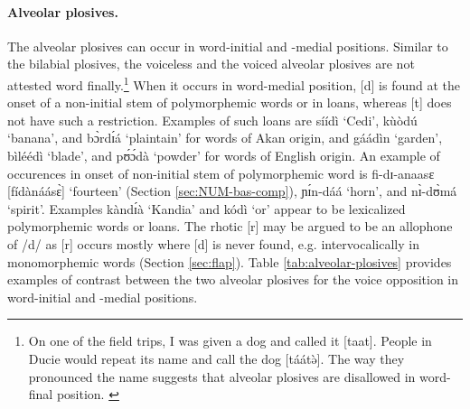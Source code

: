 \paragraph{Alveolar plosives.}
\label{sec:PHO-alveo-plos}  

The alveolar plosives can occur in word-initial and  -medial positions. Similar
to the bilabial plosives, the voiceless and the voiced alveolar plosives  are
not attested word finally.\footnote{On one of the field trips, I was given a dog
and  called it [{\sls taat}]. People in Ducie would repeat its name and call 
the 
dog
[{\sls táátə̀}]. The way they pronounced the name suggests that alveolar 
plosives are disallowed in word-final position. \label{fn:taat-epenthesis}}  
When it occurs in word-medial position,  [{\sls  d}] is found  at the onset of 
a 
non-initial stem of polymorphemic words or in loans, whereas [{\sls t}] does 
not 
have such a restriction. Examples of such loans are  {\sls síídì} `Cedi', 
{\sls kùòdú} `banana', and {\sls bɔ̀rdɪ́á} `plaintain'  for words of Akan 
origin, and  {\sls gáádìn} `garden', {\sls bìléédì} `blade',  and 
{\sls ﻿pʊ́ɔ́dà} `powder' for words of English origin. An example of occurences 
in onset of non-initial stem of polymorphemic word is {\sls fi-dɪ-anaasɛ} 
[{\sls fídànáásɛ̀}] `fourteen' (Section \ref{sec:NUM-bas-comp}),   
{\sls ɲɪ́n-dáá}	`horn', and {\sls nɪ̀-dʊ̀má}  `spirit'.  Examples 
{\sls kàndɪ́à} `Kandia'  and {\sls kódì} `or' appear to be lexicalized 
polymorphemic words or loans. The rhotic [{\sls r}] may be argued to be an 
allophone of /{\sls d}/ as   [{\sls  r}] occurs mostly where [{\sls d}] is 
never 
found, e.g. intervocalically in monomorphemic words (Section \ref{sec:flap}). 
Table \ref{tab:alveolar-plosives} provides examples of contrast between the two 
alveolar plosives for the {\sc voice} opposition in word-initial and  -medial 
positions.


